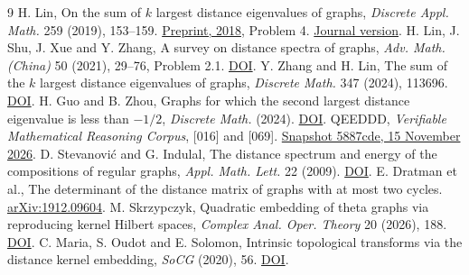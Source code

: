 \documentclass[11pt,a4paper]{article}
\begin{document}
\begin{small}\begin{thebibliography}{9}\setlength{\itemsep}{0pt}\setlength{\parskip}{0pt}
 H. Lin, On the sum of $k$ largest distance eigenvalues of graphs, \emph{Discrete Appl. Math.} 259 (2019), 153--159. \href{https://arxiv.org/abs/1805.09661}{Preprint, 2018}, Problem 4. \href{https://doi.org/10.1016/j.dam.2018.12.031}{Journal version}.
 H. Lin, J. Shu, J. Xue and Y. Zhang, A survey on distance spectra of graphs, \emph{Adv. Math. (China)} 50 (2021), 29--76, Problem 2.1. \href{https://doi.org/10.11845/sxjz.2020012a}{DOI}.
 Y. Zhang and H. Lin, The sum of the $k$ largest distance eigenvalues of graphs, \emph{Discrete Math.} 347 (2024), 113696. \href{https://doi.org/10.1016/j.disc.2023.113696}{DOI}.
 H. Guo and B. Zhou, Graphs for which the second largest distance eigenvalue is less than $-1/2$, \emph{Discrete Math.} (2024). \href{https://doi.org/10.1016/j.disc.2024.114082}{DOI}.
 QEEDDD, \emph{Verifiable Mathematical Reasoning Corpus}, [016] and [069]. \href{https://github.com/QEEDDD/Verifiable-Mathematical-Reasoning-Corpus/tree/5887cdea4898f0a3aa5bf7a8e0829697bd2b0f4b}{Snapshot 5887cde, 15 November 2026}.
 D. Stevanovi\'c and G. Indulal, The distance spectrum and energy of the compositions of regular graphs, \emph{Appl. Math. Lett.} 22 (2009). \href{https://doi.org/10.1016/j.aml.2008.11.007}{DOI}.
 E. Dratman et al., The determinant of the distance matrix of graphs with at most two cycles. \href{https://arxiv.org/abs/1912.09604}{arXiv:1912.09604}.
 M. Skrzypczyk, Quadratic embedding of theta graphs via reproducing kernel Hilbert spaces, \emph{Complex Anal. Oper. Theory} 20 (2026), 188. \href{https://doi.org/10.1007/s11785-026-02043-y}{DOI}.
 C. Maria, S. Oudot and E. Solomon, Intrinsic topological transforms via the distance kernel embedding, \emph{SoCG} (2020), 56. \href{https://doi.org/10.4230/LIPIcs.SoCG.2020.56}{DOI}.
\end{thebibliography}\end{small}
\end{document}
